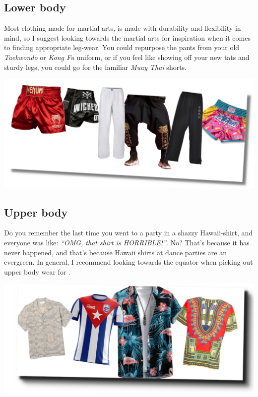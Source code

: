 \newpage
\subsection*{Lower body}
Most clothing made for martial arts, is made with durability and flexibility in mind, so I suggest looking towards the martial arts for inspiration when it comes to finding appropriate \sovs leg-wear. You could repurpose the pants from your old \textit{Taekwondo} or \textit{Kong Fu} uniform, or if you feel like showing off your new tats and sturdy legs, you could go for the familiar \textit{Muay Thai} shorts. 

\vspace{10pt}

\begin{center}
\includegraphics[scale=0.3]{03-Outro/lower-body-final}
\end{center}


\newpage
\subsection*{Upper body}
Do you remember the last time you went to a party in a shazzy Hawaii-shirt, and everyone was like: \textit{``OMG, that shirt is HORRIBLE!''}. No? That's because it has never happened, and that's because Hawaii shirts at dance parties are an evergreen. In general, I recommend looking towards the equator when picking out upper body wear for \sovsing. 

\vspace{10pt}

\begin{center}
\includegraphics[scale=0.3]{03-Outro/upper-body-wear-final}
\end{center}

